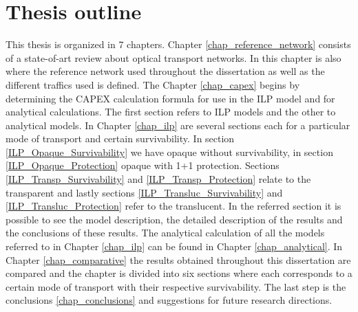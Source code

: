 \section{Thesis outline}
\label{outline}

This thesis is organized in 7 chapters. Chapter \ref{chap_reference_network} consists of a state-of-art review about optical transport networks. In this chapter is also where the reference network used throughout the dissertation as well as the different traffics used is defined. The Chapter \ref{chap_capex} begins by determining the CAPEX calculation formula for use in the ILP model and for analytical calculations. The first section refers to ILP models and the other to analytical models. In Chapter \ref{chap_ilp} are several sections each for a particular mode of transport and certain survivability. In section \ref{ILP_Opaque_Survivability} we have opaque without survivability, in section \ref{ILP_Opaque_Protection} opaque with 1+1 protection. Sections \ref{ILP_Transp_Survivability} and \ref{ILP_Transp_Protection} relate to the transparent and lastly sections \ref{ILP_Transluc_Survivability} and \ref{ILP_Transluc_Protection} refer to the translucent. In the referred section it is possible to see the model description, the detailed description of the results and the conclusions of these results. The analytical calculation of all the models referred to in Chapter \ref{chap_ilp} can be found in Chapter \ref{chap_analytical}. In Chapter \ref{chap_comparative} the results obtained throughout this dissertation are compared and the chapter is divided into six sections where each corresponds to a certain mode of transport with their respective survivability. The last step is the conclusions \ref{chap_conclusions} and suggestions for future research directions.


